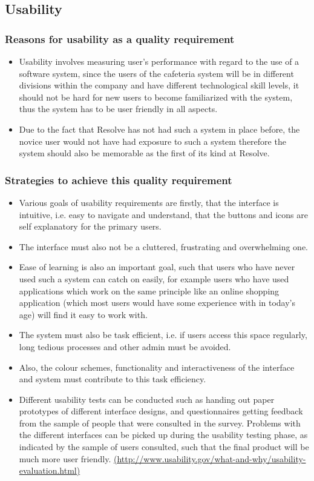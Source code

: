 \documentclass[a4paper,12pt]{article}
\begin{document}
\subsection{Usability}

 \subsubsection{Reasons for  usability as a quality requirement}
 \begin{itemize}
 \item Usability involves measuring user's performance with regard to the use of a software system, since the users of the cafeteria system will be in different divisions within the company and have different technological skill levels, it should not be hard for new users to become familiarized with the system, thus the system has to be user friendly in all aspects.
 \item Due to the fact that Resolve has not had such a system in place before, the novice user would not have had exposure to such a system therefore the system should also be memorable as the first of its kind at Resolve.  

 \end{itemize}
 \subsubsection{Strategies to achieve this quality requirement}
 \begin{itemize}
 \item Various goals of usability requirements are firstly, that the interface is intuitive, i.e. easy to navigate and understand, that the buttons and icons are self explanatory for the primary users.
 \item The interface must also not be a cluttered, frustrating and overwhelming one. 
 \item Ease of learning is also an important goal, such that users who have never used such a system can catch on easily, for example users who have used applications which work on the same principle like an online shopping application (which most users would have some experience with in today's age) will find it easy to work with.
 \item The system must also be task efficient, i.e. if users access this space regularly, long tedious processes and other admin must be avoided.
\item Also, the colour schemes, functionality and interactiveness of the interface and system must contribute to this task efficiency. 
\item Different usability tests can be conducted such as handing out paper prototypes of different interface designs, and questionnaires getting feedback from the sample of people that were consulted in the survey. Problems with the different interfaces can be picked up during the usability testing phase, as indicated by the sample of users consulted, such that the final product will be much more user friendly. \url{(http://www.usability.gov/what-and-why/usability-evaluation.html)}

 \end{itemize}
\end{document}
